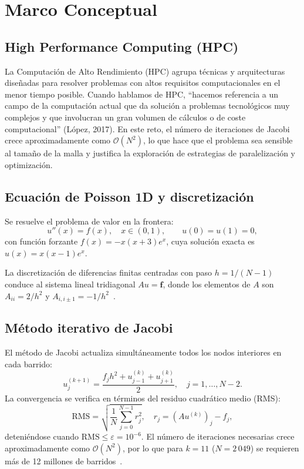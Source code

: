\documentclass{article}
\begin{document}
\section{Marco Conceptual}

\subsection{High Performance Computing (HPC)}

La Computación de Alto Rendimiento (HPC) agrupa técnicas y arquitecturas
diseñadas para resolver problemas con altos requisitos computacionales en el
menor tiempo posible.  Cuando hablamos de HPC, ``hacemos referencia a un campo
de la computación actual que da solución a problemas tecnológicos muy complejos
y que involucran un gran volumen de cálculos o de coste computacional''
(López, 2017).  En este reto, el número de iteraciones de Jacobi crece
aproximadamente como $\mathcal{O}(N^2)$, lo que hace que el problema sea
sensible al tamaño de la malla y justifica la exploración de estrategias de
paralelización y optimización.

\subsection{Ecuación de Poisson 1D y discretización}

Se resuelve el problema de valor en la frontera:
\[
  u''(x) = f(x), \quad x \in (0,1), \qquad u(0) = u(1) = 0,
\]
con función forzante $f(x) = -x(x+3)e^x$, cuya solución exacta es
$u(x) = x(x-1)e^x$.

La discretización de diferencias finitas centradas con paso $h = 1/(N-1)$
conduce al sistema lineal tridiagonal $Au = \mathbf{f}$, donde los elementos de
$A$ son $A_{ii} = 2/h^2$ y $A_{i,i\pm 1} = -1/h^2$~\cite{burkardt}.

\subsection{Método iterativo de Jacobi}

El método de Jacobi actualiza simultáneamente todos los nodos interiores en cada
barrido:
\[
  u_j^{(k+1)} = \frac{f_j h^2 + u_{j-1}^{(k)} + u_{j+1}^{(k)}}{2},
  \quad j = 1, \ldots, N-2.
\]
La convergencia se verifica en términos del residuo cuadrático medio (RMS):
\[
  \text{RMS} = \sqrt{\frac{1}{N}\sum_{j=0}^{N-1} r_j^2},
\quad
  r_j = (Au^{(k)})_j - f_j,
\]
deteniéndose cuando $\text{RMS} \leq \varepsilon = 10^{-6}$.  El número de
iteraciones necesarias crece aproximadamente como $\mathcal{O}(N^2)$, por lo que
para $k=11$ ($N=2\,049$) se requieren más de 12 millones de
barridos~\cite{burkardt}.
\end{document}
